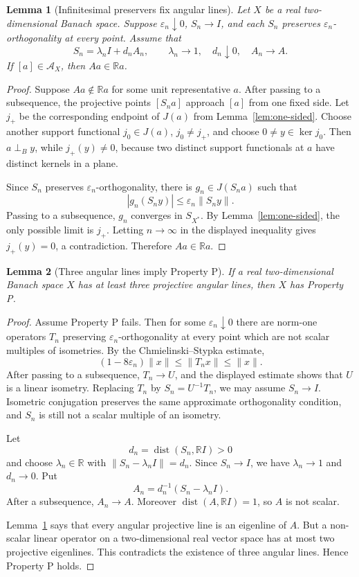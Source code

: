 \documentclass[11pt]{article}
\newtheorem{lemma}{Lemma}
\newcommand{\eps}{\varepsilon}
\newcommand{\R}{\mathbb R}
\newcommand{\cA}{\mathcal A}
\newcommand{\perpB}{\perp_B}
\newcommand{\dist}{\operatorname{dist}}
\begin{document}
\begin{lemma}[Infinitesimal preservers fix angular lines]
\label{lem:infinitesimal-fixes}
Let \(X\) be a real two-dimensional Banach space.  Suppose
\(\eps_n\downarrow0\), \(S_n\to I\), and each \(S_n\) preserves
\(\eps_n\)-orthogonality at every point.  Assume that
\[
  S_n=\lambda_n I+d_n A_n,\qquad \lambda_n\to1,\quad d_n\downarrow0,\quad
  A_n\to A.
\]
If \([a]\in\cA_X\), then \(Aa\in\R a\).
\end{lemma}

\begin{proof}
Suppose \(Aa\notin\R a\) for some unit representative \(a\).  After passing to
a subsequence, the projective points \([S_n a]\) approach \([a]\) from one
fixed side.  Let \(j_+\) be the corresponding endpoint of \(J(a)\) from
Lemma~\ref{lem:one-sided}.  Choose another support functional
\(j_0\in J(a)\), \(j_0\neq j_+\), and choose \(0\neq y\in\ker j_0\).  Then
\(a\perpB y\), while \(j_+(y)\neq0\), because two distinct support functionals
at \(a\) have distinct kernels in a plane.

Since \(S_n\) preserves \(\eps_n\)-orthogonality, there is
\(g_n\in J(S_n a)\) such that
\[
  |g_n(S_n y)|\leq \eps_n\|S_n y\|.
\]
Passing to a subsequence, \(g_n\) converges in \(S_{X^*}\).  By
Lemma~\ref{lem:one-sided}, the only possible limit is \(j_+\).  Letting
\(n\to\infty\) in the displayed inequality gives \(j_+(y)=0\), a
contradiction.  Therefore \(Aa\in\R a\).
\end{proof}

\begin{lemma}[Three angular lines imply Property P]
\label{lem:three-positive}
If a real two-dimensional Banach space \(X\) has at least three projective
angular lines, then \(X\) has Property P.
\end{lemma}

\begin{proof}
Assume Property P fails.  Then for some \(\eps_n\downarrow0\) there are
norm-one operators \(T_n\) preserving \(\eps_n\)-orthogonality at every point
which are not scalar multiples of isometries.  By the Chmielinski--Stypka
estimate,
\[
  (1-8\eps_n)\|x\|\leq\|T_nx\|\leq\|x\|.
\]
After passing to a subsequence, \(T_n\to U\), and the displayed estimate shows
that \(U\) is a linear isometry.  Replacing \(T_n\) by \(S_n=U^{-1}T_n\), we
may assume \(S_n\to I\).  Isometric conjugation preserves the same approximate
orthogonality condition, and \(S_n\) is still not a scalar multiple of an
isometry.

Let
\[
  d_n=\dist(S_n,\R I)>0
\]
and choose \(\lambda_n\in\R\) with \(\|S_n-\lambda_n I\|=d_n\).  Since
\(S_n\to I\), we have \(\lambda_n\to1\) and \(d_n\to0\).  Put
\[
  A_n=d_n^{-1}(S_n-\lambda_n I).
\]
After a subsequence, \(A_n\to A\).  Moreover \(\dist(A,\R I)=1\), so \(A\) is
not scalar.

Lemma~\ref{lem:infinitesimal-fixes} says that every angular projective line is
an eigenline of \(A\).  But a non-scalar linear operator on a two-dimensional
real vector space has at most two projective eigenlines.  This contradicts the
existence of three angular lines.  Hence Property P holds.
\end{proof}
\end{document}
